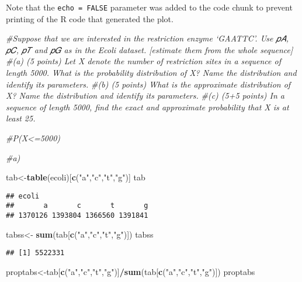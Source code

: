 \documentclass[
]{article}
\newenvironment{Shaded}{\begin{snugshade}}{\end{snugshade}}
\newcommand{\CommentTok}[1]{\textcolor[rgb]{0.56,0.35,0.01}{\textit{#1}}}
\newcommand{\KeywordTok}[1]{\textcolor[rgb]{0.13,0.29,0.53}{\textbf{#1}}}
\newcommand{\NormalTok}[1]{#1}
\newcommand{\OperatorTok}[1]{\textcolor[rgb]{0.81,0.36,0.00}{\textbf{#1}}}
\newcommand{\StringTok}[1]{\textcolor[rgb]{0.31,0.60,0.02}{#1}}
\begin{document}
Note that the \texttt{echo\ =\ FALSE} parameter was added to the code
chunk to prevent printing of the R code that generated the plot.

\begin{Shaded}
\begin{Highlighting}[]
\CommentTok{#Suppose that we are interested in the restriction enzyme ‘GAATTC’. Use 𝑝𝐴, 𝑝𝐶, 𝑝𝑇 and 𝑝𝐺 as in the Ecoli dataset. [estimate them from the whole sequence]}
\CommentTok{#(a) (5 points) Let X denote the number of restriction sites in a sequence of length 5000. What is the probability distribution of X? Name the distribution and identify its parameters.}
\CommentTok{#(b) (5 points) What is the approximate distribution of X? Name the distribution and identify its parameters.}
\CommentTok{#(c) (5+5 points) In a sequence of length 5000, find the exact and approximate probability that X is at least 25.}

\CommentTok{#P(X<=5000)}

\CommentTok{#a)}

\NormalTok{tab<-}\KeywordTok{table}\NormalTok{(ecoli)[}\KeywordTok{c}\NormalTok{(}\StringTok{"a"}\NormalTok{,}\StringTok{"c"}\NormalTok{,}\StringTok{"t"}\NormalTok{,}\StringTok{"g"}\NormalTok{)]}
\NormalTok{tab}
\end{Highlighting}
\end{Shaded}

\begin{verbatim}
## ecoli
##       a       c       t       g 
## 1370126 1393804 1366560 1391841
\end{verbatim}

\begin{Shaded}
\begin{Highlighting}[]
\NormalTok{tabss<-}\StringTok{ }\KeywordTok{sum}\NormalTok{(tab[}\KeywordTok{c}\NormalTok{(}\StringTok{"a"}\NormalTok{,}\StringTok{"c"}\NormalTok{,}\StringTok{"t"}\NormalTok{,}\StringTok{"g"}\NormalTok{)])}
\NormalTok{tabss}
\end{Highlighting}
\end{Shaded}

\begin{verbatim}
## [1] 5522331
\end{verbatim}

\begin{Shaded}
\begin{Highlighting}[]
\NormalTok{proptabs<-tab[}\KeywordTok{c}\NormalTok{(}\StringTok{"a"}\NormalTok{,}\StringTok{"c"}\NormalTok{,}\StringTok{"t"}\NormalTok{,}\StringTok{"g"}\NormalTok{)]}\OperatorTok{/}\KeywordTok{sum}\NormalTok{(tab[}\KeywordTok{c}\NormalTok{(}\StringTok{"a"}\NormalTok{,}\StringTok{"c"}\NormalTok{,}\StringTok{"t"}\NormalTok{,}\StringTok{"g"}\NormalTok{)])}
\NormalTok{proptabs}
\end{Highlighting}
\end{Shaded}
\end{document}
